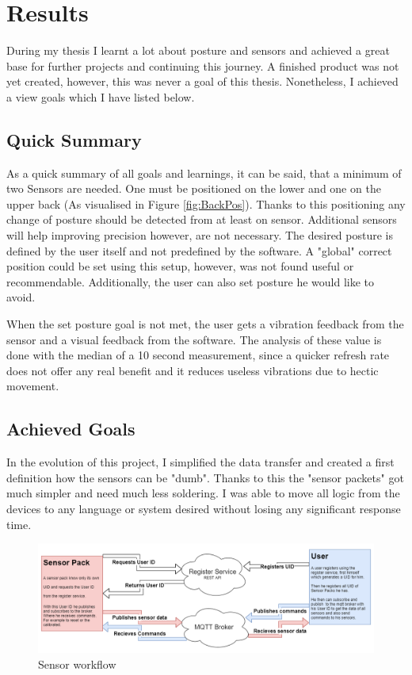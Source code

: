 \chapter*{Results}
\label{chap:Results}
\setcounter{section}{0}

During my thesis I learnt a lot about posture and sensors and achieved a great base for further projects and continuing this journey. A finished product was not yet created, however, this was never a goal of this thesis. Nonetheless, I achieved a view goals which I have listed below.

\section{Quick Summary}

As a quick summary of all goals and learnings, it can be said, that a minimum of two Sensors are needed. One must be positioned on the lower and one on the upper back (As visualised in Figure \ref{fig:BackPos}). Thanks to this positioning any change of posture should be detected from at least on sensor. Additional sensors will help improving precision however, are not necessary. The desired posture is defined by the user itself and not predefined by the software. A "global" correct position could be set using this setup, however, was not found useful or recommendable. \cite{SitUpSt77:online} Additionally, the user can also set posture he would like to avoid.

When the set posture goal is not met, the user gets a vibration feedback from the sensor and a visual feedback from the software. The analysis of these value is done with the median of a 10 second measurement, since a quicker refresh rate does not offer any real benefit and it reduces useless vibrations due to hectic movement.

\section{Achieved Goals}

In the evolution of this project, I simplified the data transfer and created a first definition how the sensors can be "dumb". Thanks to this the "sensor packets" got much simpler and need much less soldering. I was able to move all logic from the devices to any language or system desired without losing any significant response time. 

\begin{figure}[h]
  \begin{center}
\includegraphics[width=\textwidth]{images/DumbSensor.png}
  \end{center}
  \caption{Sensor workflow}
  \label{fig:SensorWorkflow}
\end{figure}

